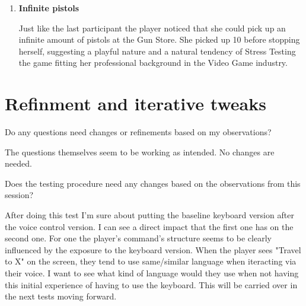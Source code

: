 \begin{enumerate}
    The install of WhisperCPP used in this project has a tendency to hallucinate - generate output that's not real, notably it produces "You" when confused. This seems to be a bug deep inside WhisperCPP when running on GPU. The CPU version doesn't have this issue but it runs more than 20x slower on the hardware that was used for this demo. The observed bug would clear up on WhisperCPP restart and come back after about 2-3 requests. 
    To go around this issue I built an API responsible for restarting WhisperCPP on every incoming request. This solution broke during this test, since the behaviour of WhisperCPP persisted despite the restarts. What ultimately fixed it was rebooting the machine running WhisperCPP. I go deeper into this in the thesis document itself.


    \item \textbf{Infinite pistols}
    
    Just like the last participant the player noticed that she could pick up an infinite amount of pistols at the Gun Store. She picked up 10 before stopping herself, suggesting a playful nature and a natural tendency of Stress Testing the game fitting her professional background in the Video Game industry.
\end{enumerate}



\section{Refinment and iterative tweaks}

\begin{QandA}
    \item Do any questions need changes or refinements based on my observations?
    \begin{answered}
        The questions themselves seem to be working as intended. No changes are needed.
    \end{answered}

    \item Does the testing procedure need any changes based on the observations from this session?
    \begin{answered}
        After doing this test I'm sure about putting the baseline keyboard version after the voice control version. I can see a direct impact that the first one has on the second one. For one the player's command's structure seems to be clearly influenced by the exposure to the keyboard version. When the player sees "Travel to X" on the screen, they tend to use same/similar language when iteracting via their voice. I want to see what kind of language would they use when not having this initial experience of having to use the keyboard. This will be carried over in the next tests moving forward.
    \end{answered}
\end{QandA}